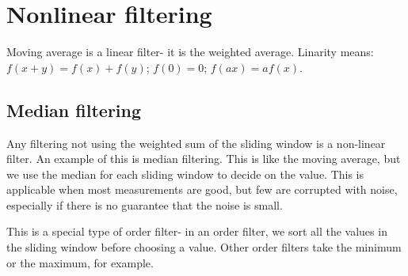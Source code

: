 \documentclass[a4paper, openany]{memoir}
\begin{document}
\section{Nonlinear filtering}
Moving average is a linear filter- it is the weighted average. Linarity means: $f(x + y) = f(x) + f(y)$; $f(0) = 0$; $f(ax) = af(x)$.

\subsection{Median filtering}
Any filtering not using the weighted sum of the sliding window is a non-linear filter. An example of this is median filtering. This is like the moving average, but we use the median for each sliding window to decide on the value. This is applicable when most measurements are good, but few are corrupted with noise, especially if there is no guarantee that the noise is small.

This is a special type of order filter- in an order filter, we sort all the values in the sliding window before choosing a value. Other order filters take the minimum or the maximum, for example. 
\end{document}
